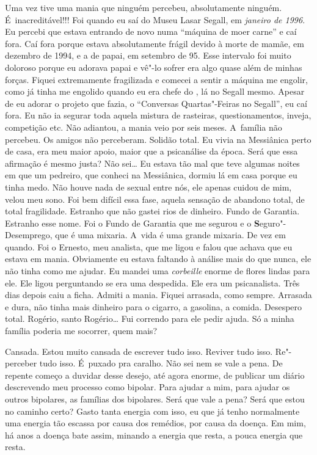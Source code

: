 Uma vez tive uma mania que ninguém percebeu, absolutamente ninguém. É~inacreditável!!! Foi quando eu saí do Museu Lasar Segall, em
\emph{janeiro de 1996}. Eu percebi que estava entrando de novo numa
``máquina de moer carne'' e caí fora. Caí fora porque estava
absolutamente frágil devido à morte de mamãe, em dezembro de 1994, e a
de papai, em setembro de 95. Esse intervalo foi muito doloroso porque eu
adorava papai e vê"-lo sofrer era algo quase além de minhas forças.
Fiquei extremamente fragilizada e comecei a sentir a máquina me engolir,
como já tinha me engolido quando eu era chefe do , lá no Segall
mesmo. Apesar de eu adorar o projeto que fazia, o ``Conversas
Quartas"-Feiras no Segall'', eu caí fora. Eu não ia segurar toda aquela
mistura de rasteiras, questionamentos, inveja, competição etc. Não
adiantou, a mania veio por seis meses. A~família não percebeu. Os amigos
não perceberam. Solidão total. Eu vivia na Messiânica perto de casa, era
meu maior apoio, maior que a psicanálise da época. Será que essa
afirmação é mesmo justa? Não sei… Eu estava tão mal que teve
algumas noites em que um pedreiro, que conheci na Messiânica, dormiu lá
em casa porque eu tinha medo. Não houve nada de sexual entre nós, ele
apenas cuidou de mim, velou meu sono. Foi bem difícil essa fase, aquela
sensação de abandono total, de total fragilidade. Estranho que não
gastei rios de dinheiro. Fundo de Garantia. Estranho esse nome. Foi o
Fundo de Garantia que me segurou e o \textbf{S}eguro"-Desemprego, que é
uma mixaria. A~vida é uma grande mixaria. De vez em quando. Foi o
Ernesto, meu analista, que me ligou e falou que achava que eu estava em
mania. Obviamente eu estava faltando à análise mais do que nunca, ele
não tinha como me ajudar. Eu mandei uma \emph{corbeille} enorme de
flores lindas para ele. Ele ligou perguntando se era uma despedida. Ele
era um psicanalista. Três dias depois caiu a ficha. Admiti a mania.
Fiquei arrasada, como sempre. Arrasada e dura, não tinha mais dinheiro
para o cigarro, a gasolina, a comida. Desespero total. Rogério, santo
Rogério… Fui correndo para ele pedir ajuda. Só a minha família
poderia me socorrer, quem mais?

Cansada. Estou muito cansada de escrever tudo isso. Reviver tudo isso.
Re"-perceber tudo isso. É~puxado pra caralho. Não sei nem se vale a pena.
De repente começo a duvidar desse desejo, até agora enorme, de publicar
um diário descrevendo meu processo como bipolar. Para ajudar a mim, para
ajudar os outros bipolares, as famílias dos bipolares. Será que vale a
pena? Será que estou no caminho certo? Gasto tanta energia com isso, eu
que já tenho normalmente uma energia tão escassa por causa dos remédios,
por causa da doença. Em mim, há anos a doença bate assim, minando a
energia que resta, a pouca energia que resta.

